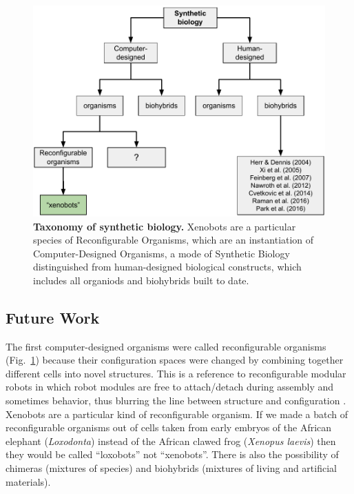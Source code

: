 \begin{figure}[t]
    \centering
    \includegraphics[width=0.8\linewidth]{fig/synthbio.pdf}
    \vspace{1pt}
    \caption{%
    \textbf{Taxonomy of synthetic biology.}
    Xenobots are a particular species of Reconfigurable Organisms, which are an instantiation of Computer-Designed Organisms, a mode of Synthetic Biology distinguished from human-designed biological constructs, which includes all organiods and biohybrids built to date.
    \label{fig:synthbio}%
    }
\end{figure}


\subsection{Future Work}


The first computer-designed organisms were called reconfigurable organisms (Fig.~\ref{fig:synthbio}) because their configuration spaces were changed by combining together different cells into novel structures.
This is a reference to reconfigurable modular robots in which robot modules are free to attach/detach during assembly and sometimes behavior, thus blurring the line between structure and configuration  \cite{pathak2019learning}.
Xenobots are a particular kind of reconfigurable organism.
If we made a batch of reconfigurable organisms out of cells taken from early embryos of the
African elephant (\textit{Loxodonta})
instead of the African clawed frog (\textit{Xenopus laevis})
then they would be called ``loxobots'' not ``xenobots''.
There is also the possibility of chimeras (mixtures of species) and biohybrids (mixtures of living and artificial materials).


